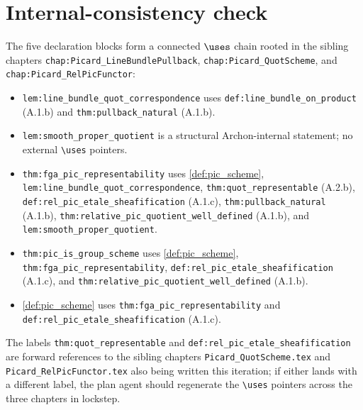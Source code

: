 \section{Internal-consistency check}
\label{sec:fga_pic_consistency_check}

The five declaration blocks form a connected \(\uses\) chain rooted in the
sibling chapters \texttt{chap:Picard_LineBundlePullback},
\texttt{chap:Picard_QuotScheme}, and \texttt{chap:Picard_RelPicFunctor}:
\begin{itemize}
  \item \texttt{lem:line_bundle_quot_correspondence} uses
    \texttt{def:line_bundle_on_product} (A.1.b) and
    \texttt{thm:pullback_natural} (A.1.b).
  \item \texttt{lem:smooth_proper_quotient} is a structural Archon-internal
    statement; no external \texttt{\textbackslash uses} pointers.
  \item \texttt{thm:fga_pic_representability} uses
    \cref{def:pic_scheme}, \texttt{lem:line_bundle_quot_correspondence},
    \texttt{thm:quot\_representable} (A.2.b),
    \texttt{def:rel\_pic\_etale\_sheafification} (A.1.c),
    \texttt{thm:pullback_natural} (A.1.b),
    \texttt{thm:relative_pic_quotient_well_defined} (A.1.b), and
    \texttt{lem:smooth_proper_quotient}.
  \item \texttt{thm:pic_is_group_scheme} uses
    \cref{def:pic_scheme}, \texttt{thm:fga_pic_representability},
    \texttt{def:rel\_pic\_etale\_sheafification} (A.1.c), and
    \texttt{thm:relative_pic_quotient_well_defined} (A.1.b).
  \item \cref{def:pic_scheme} uses
    \texttt{thm:fga_pic_representability} and
    \texttt{def:rel\_pic\_etale\_sheafification} (A.1.c).
\end{itemize}
The labels \texttt{thm:quot\_representable} and
\texttt{def:rel\_pic\_etale\_sheafification} are forward references to
the sibling chapters \texttt{Picard\_QuotScheme.tex} and
\texttt{Picard\_RelPicFunctor.tex} also being written this iteration; if
either lands with a different label, the plan agent should regenerate
the \texttt{\textbackslash uses} pointers across the three chapters in lockstep.
